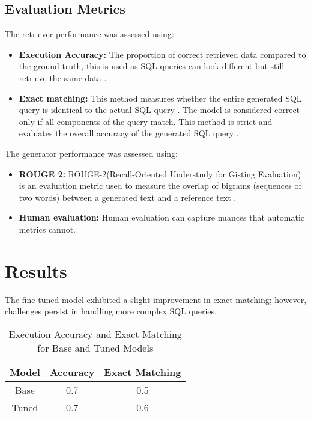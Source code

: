 \documentclass[11pt]{article}
\begin{document}
\subsection{Evaluation Metrics}
The retriever performance was assessed using:
\begin{itemize}
    \item \textbf{Execution Accuracy:} The proportion of correct retrieved data compared to the ground truth, this is used as SQL queries can look different but still retrieve the same data \cite{spider}.
    \item \textbf{Exact matching:} This method measures whether the entire generated SQL query is identical to the actual SQL query \cite{spider}. The model is considered correct only if all components of the query match. This method is strict and evaluates the overall accuracy of the generated SQL query .
\end{itemize}

The generator performance was assessed using:
\begin{itemize}
    \item \textbf{ROUGE 2:} ROUGE-2(Recall-Oriented Understudy for Gisting Evaluation) is an evaluation metric used to measure the overlap of bigrams (sequences of two words) between a generated text and a reference text \cite{ROUGE}.
    \item \textbf{Human evaluation:} Human evaluation can capture nuances that automatic metrics cannot.
    
\end{itemize}




\section{Results}

The fine-tuned model exhibited a slight improvement in exact matching; however, challenges persist in handling more complex SQL queries.

\begin{table}[h!]
\centering
\begin{tabular}{|c|c|c|}
\hline
\textbf{Model} & \textbf{Accuracy} & \textbf{Exact Matching} \\ \hline
Base           & 0.7                    & 0.5                       \\ \hline
Tuned          & 0.7                    & 0.6                       \\ \hline
\end{tabular}
\caption{Execution Accuracy and Exact Matching for Base and Tuned Models}
\label{tab:accuracy_em}
\end{table}
\end{document}
